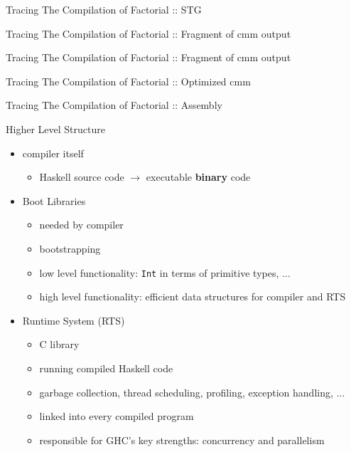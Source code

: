 \documentclass{beamer}
\begin{document}
\begin{frame}{Tracing The Compilation of Factorial :: STG}
  \tiny
  
\end{frame}


\begin{frame}{Tracing The Compilation of Factorial :: Fragment of cmm output}
  \tiny
  
\end{frame}

\begin{frame}{Tracing The Compilation of Factorial :: Fragment of cmm output}
  \tiny
  
\end{frame}

\begin{frame}{Tracing The Compilation of Factorial :: Optimized cmm}
  \tiny
  
\end{frame}


\begin{frame}{Tracing The Compilation of Factorial :: Assembly}
  \tiny
  
\end{frame}


\begin{frame}{Higher Level Structure}
  \begin{itemize}
    \item compiler itself
    \begin{itemize}
      \item Haskell source code $\rightarrow$ executable \textbf{binary} code
    \end{itemize}
    \pause
    \item Boot Libraries
    \begin{itemize}
      \item needed by compiler
      \item bootstrapping
      \item low level functionality: \texttt{Int} in terms of primitive types, $\ldots$
      \item high level functionality: efficient data structures for compiler
      and RTS
    \end{itemize}
    \pause
    \item Runtime System (RTS)
    \begin{itemize}
      \item C library
      \item running compiled Haskell code
      \item garbage collection, thread scheduling, profiling, exception
      handling, $\ldots$
      \item linked into every compiled program
      \item responsible for GHC's key strengths: concurrency and parallelism
    \end{itemize}
  \end{itemize}
\end{frame}
\end{document}
